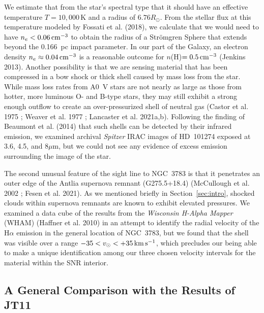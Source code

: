 \documentclass[modern]{aastex63}
\newcommand{\kms}{\ensuremath{\,\rm{km\,s^{-1}}}}
\begin{document}
We estimate that from the star’s spectral type that it should have an effective temperature 
$T=10,000$\,K and a radius of $6.76R_\odot$.  From the stellar flux at this temperature 
modeled by Fossati et al. (2018), we calculate that we would need to have $n_e< 0.06\,{\rm 
cm}^{-3}$ to obtain the radius of a Strömgren Sphere that extends beyond the 0.166~pc impact 
parameter.  In our part of the Galaxy, an electron density $n_e\approx 0.04\,{\rm cm}^{-3}$ is a 
reasonable outcome for $n$(H)$=0.5\,{\rm cm}^{-3}$ (Jenkins 2013). Another possibility is that 
we are sensing material that has been compressed in a bow shock or thick shell caused by mass 
loss from the star.  While mass loss rates from A0~V stars are not nearly as large as those from 
hotter, more  luminous O- and B-type stars, they may still exhibit a strong enough outflow to 
create an over-pressurized shell of neutral gas
(Castor et al. 1975 ; Weaver et al. 1977 ; Lancaster et al. 2021a,b).  Following the finding 
of Beaumont et al. (2014) that such shells can be detected by their infrared emission, we 
examined archival {\it Spitzer\/} IRAC images of HD~101274 exposed at 3.6, 4.5, and $8\mu$m, 
but we could not see any evidence of excess emission surrounding the image of the star.

The second unusual feature of the sight line to NGC~3783 is that it penetrates an outer edge of 
the Antlia supernova remnant (G275.5+18.4) (McCullough et al. 2002 ; Fesen et al. 2021).  As 
we mentioned briefly in Section~\ref{sec:intro}, shocked clouds within supernova remnants are 
known to exhibit elevated pressures.  We examined a data cube of the results from the {\it 
Wisconsin H-Alpha Mapper\/} (WHAM) (Haffner et al. 2010) in an attempt to identify the radial 
velocity of the H$\alpha$ emission in the general location of NGC~3783, but we found that the 
shell was visible over a range $-35 < v_\odot < +35\kms$, which precludes our being able to 
make a unique identification among our three chosen  velocity intervals for the 
material within the SNR interior.

\subsection{A General Comparison with the Results of JT11}\label{sec:general_comparison}
\end{document}
